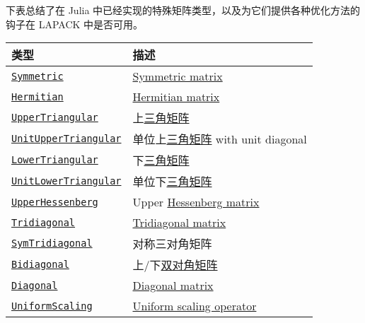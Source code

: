 下表总结了在 Julia 中已经实现的特殊矩阵类型，以及为它们提供各种优化方法的钩子在 LAPACK 中是否可用。




\begin{table}[h]

\begin{tabulary}{\linewidth}{|L|L|}
\hline
类型 & 描述 \\
\hline
\hyperlink{17683454167504168761}{\texttt{Symmetric}} & \href{https://en.wikipedia.org/wiki/Symmetric\_matrix}{Symmetric matrix} \\
\hline
\hyperlink{938713992181310063}{\texttt{Hermitian}} & \href{https://en.wikipedia.org/wiki/Hermitian\_matrix}{Hermitian matrix} \\
\hline
\hyperlink{6344726545165008167}{\texttt{UpperTriangular}} & 上\href{https://en.wikipedia.org/wiki/Triangular\_matrix}{三角矩阵} \\
\hline
\hyperlink{17221720404477798393}{\texttt{UnitUpperTriangular}} & 单位上\href{https://en.wikipedia.org/wiki/Triangular\_matrix}{三角矩阵} with unit diagonal \\
\hline
\hyperlink{15116078732779234709}{\texttt{LowerTriangular}} & 下\href{https://en.wikipedia.org/wiki/Triangular\_matrix}{三角矩阵} \\
\hline
\hyperlink{2163321084999097240}{\texttt{UnitLowerTriangular}} & 单位下\href{https://en.wikipedia.org/wiki/Triangular\_matrix}{三角矩阵} \\
\hline
\hyperlink{6167777885202579792}{\texttt{UpperHessenberg}} & Upper \href{https://en.wikipedia.org/wiki/Hessenberg\_matrix}{Hessenberg matrix} \\
\hline
\hyperlink{17820886359515748171}{\texttt{Tridiagonal}} & \href{https://en.wikipedia.org/wiki/Tridiagonal\_matrix}{Tridiagonal matrix} \\
\hline
\hyperlink{6062797780727203318}{\texttt{SymTridiagonal}} & 对称三对角矩阵 \\
\hline
\hyperlink{6156150905679680892}{\texttt{Bidiagonal}} & 上/下\href{https://en.wikipedia.org/wiki/Bidiagonal\_matrix}{双对角矩阵} \\
\hline
\hyperlink{3300114559258360989}{\texttt{Diagonal}} & \href{https://en.wikipedia.org/wiki/Diagonal\_matrix}{Diagonal matrix} \\
\hline
\hyperlink{723087258311673942}{\texttt{UniformScaling}} & \href{https://en.wikipedia.org/wiki/Uniform\_scaling}{Uniform scaling operator} \\
\hline
\end{tabulary}

\end{table}



